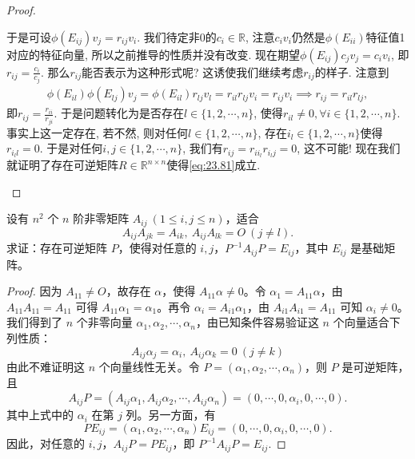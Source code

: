 \documentclass[../../main.tex]{subfiles}
\begin{document}
\begin{proof}
\begin{enumerate}[(1)]
于是可设$\phi(E_{ij})v_j = r_{ij}v_i$. 我们待定非0的$c_i \in \mathbb{R}$, 注意$c_i v_i$仍然是$\phi(E_{ii})$特征值1对应的特征向量, 所以之前推导的性质并没有改变. 现在期望$\phi(E_{ij})c_j v_j = c_i v_i$, 即$r_{ij} = \frac{c_i}{c_j}$. 那么$r_{ij}$能否表示为这种形式呢? 这诱使我们继续考虑$r_{ij}$的样子.
注意到
\begin{align*}
\phi(E_{il})\phi(E_{lj})v_j = \phi(E_{il})r_{lj}v_l = r_{il}r_{lj}v_i = r_{ij}v_i \implies r_{ij} = r_{il}r_{lj},
\end{align*}
即$r_{ij} = \frac{r_{ii}}{r_{ji}}$. 于是问题转化为是否存在$l \in \{1,2,\cdots,n\}$, 使得$r_{il} \neq 0, \forall i \in \{1,2,\cdots,n\}$.
事实上这一定存在, 若不然, 则对任何$l \in \{1,2,\cdots,n\}$, 存在$i_l \in \{1,2,\cdots,n\}$使得$r_{i_l l} = 0$. 于是对任何$i,j \in \{1,2,\cdots,n\}$, 我们有$r_{ij} = r_{i i_l} r_{i_l j} = 0$, 这不可能! 现在我们就证明了存在可逆矩阵$R \in \mathbb{R}^{n \times n}$使得\eqref{eq:23.81}成立.
\end{enumerate}

\end{proof}

\begin{theorem}[基础矩阵的刻画]\label{theorem:非零相似于基础矩阵}
设有 $n^2$ 个 $n$ 阶非零矩阵 $A_{ij}\ (1 \leqslant  i,j \leqslant  n)$，适合
\[
A_{ij}A_{jk} = A_{ik},\ A_{ij}A_{lk} = O\ (j \neq l).
\]
求证：存在可逆矩阵 $P$，使得对任意的 $i,j$，$P^{-1}A_{ij}P = E_{ij}$，其中 $E_{ij}$ 是基础矩阵。
\end{theorem}
\begin{proof}
因为 $A_{11} \neq O$，故存在 $\alpha$，使得 $A_{11}\alpha \neq 0$。令 $\alpha_1 = A_{11}\alpha$，由 $A_{11}A_{11} = A_{11}$ 可得 $A_{11}\alpha_1 = \alpha_1$。再令 $\alpha_i = A_{i1}\alpha_1$，由 $A_{i1}A_{i1} = A_{11}$ 可知 $\alpha_i \neq 0$。我们得到了 $n$ 个非零向量 $\alpha_1,\alpha_2,\cdots,\alpha_n$，由已知条件容易验证这 $n$ 个向量适合下列性质：
\[A_{ij}\alpha_j = \alpha_i,\ A_{ij}\alpha_k = 0\ (j \neq k)\]
由此不难证明这 $n$ 个向量线性无关。令 $P = (\alpha_1,\alpha_2,\cdots,\alpha_n)$，则 $P$ 是可逆矩阵，且
\[
A_{ij}P = (A_{ij}\alpha_1,A_{ij}\alpha_2,\cdots,A_{ij}\alpha_n) = (0,\cdots,0,\alpha_i,0,\cdots,0).
\]
其中上式中的 $\alpha_i$ 在第 $j$ 列。另一方面，有
\[
PE_{ij} = (\alpha_1,\alpha_2,\cdots,\alpha_n)E_{ij} = (0,\cdots,0,\alpha_i,0,\cdots,0).
\]
因此，对任意的 $i,j$，$A_{ij}P = PE_{ij}$，即 $P^{-1}A_{ij}P = E_{ij}$.

\end{proof}
\end{document}
